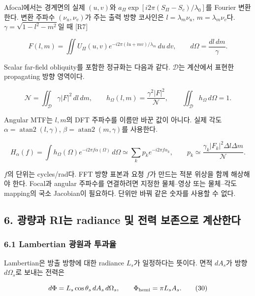 \documentclass[
  a4paper,
]{article}
\begin{document}
Afocal에서는 경계면의 실제 \((u,v)\)와
\(a_\Pi\exp[i2\pi(S_\Pi-S_c)/\lambda_0]\)를 Fourier 변환한다. 변환
주파수 \((\nu_u,\nu_v)\)가 주는 출력 방향 코사인은 \(l=\lambda_m\nu_u\),
\(m=\lambda_m\nu_v\)다. \(\gamma=\sqrt{1-l^2-m^2}\)일 때 {[}R7{]}

\[
F(l,m)=\iint U_\Pi(u,v)
 e^{-i2\pi(lu+mv)/\lambda_m}\,du\,dv,\qquad
d\Omega=\frac{dl\,dm}{\gamma}.
\tag{27}
\]

Scalar far-field obliquity를 포함한 정규화는 다음과 같다.
\(\mathcal D\)는 계산에서 표현한 propagating 방향 영역이다.

\[
\mathcal N=\iint_{\mathcal D}\gamma|F|^2\,dl\,dm,\qquad
h_\Omega(l,m)=\frac{\gamma^2|F|^2}{\mathcal N},\qquad
\iint_{\mathcal D}h_\Omega\,d\Omega=1.
\tag{28}
\]

Angular MTF는 \(l,m\)의 DFT 주파수를 이름만 바꾼 값이 아니다. 실제 각도
\(\alpha=\operatorname{atan2}(l,\gamma)\),
\(\beta=\operatorname{atan2}(m,\gamma)\)를 사용한다.

\[
H_\alpha(f)=\int h_\Omega(\Omega)e^{-i2\pi f\alpha(\Omega)}\,d\Omega
 \simeq\sum_kp_k e^{-i2\pi f\alpha_k},\qquad
p_k\simeq\frac{\gamma_k|F_k|^2\Delta l\Delta m}{\mathcal N}.
\tag{29}
\]

\(f\)의 단위는 cycles/rad다. FFT 방향 표본과 요청 \(f\)가 만드는 적분
위상을 함께 해상해야 한다. Focal과 angular 주파수를 연결하려면 지정한
물체--영상 또는 물체--각도 mapping의 국소 Jacobian이 필요하다. 단위만
바꿔 같은 숫자를 사용할 수 없다.

\hypertarget{uxad11uxb7c9uxacfc-riuxb294-radiance-uxbc0f-uxc804uxb825-uxbcf4uxc874uxc73cuxb85c-uxacc4uxc0b0uxd55cuxb2e4}{%
\subsection{6. 광량과 RI는 radiance 및 전력 보존으로
계산한다}\label{uxad11uxb7c9uxacfc-riuxb294-radiance-uxbc0f-uxc804uxb825-uxbcf4uxc874uxc73cuxb85c-uxacc4uxc0b0uxd55cuxb2e4}}

\hypertarget{lambertian-uxad11uxc6d0uxacfc-uxd22cuxacfcuxc728}{%
\subsubsection{6.1 Lambertian 광원과
투과율}\label{lambertian-uxad11uxc6d0uxacfc-uxd22cuxacfcuxc728}}

Lambertian은 방출 방향에 대한 radiance \(L_s\)가 일정하다는 뜻이다. 면적
\(dA_s\)가 방향 \(d\Omega_s\)로 보내는 전력은

\[
d\Phi=L_s\cos\theta_s\,dA_s\,d\Omega_s,
\qquad\Phi_{\rm hemi}=\pi L_s A_s.
\tag{30}
\]
\end{document}
